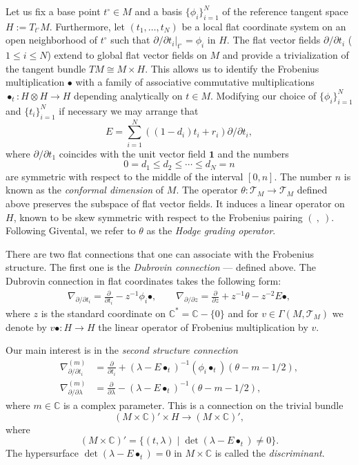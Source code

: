 \documentclass[pdftex]{sigma}
\numberwithin{equation}{section}
\newcommand{\CC}{\mathbb{C}}
\newcommand{\T}{\mathcal{T}}
\begin{document}
Let us fix a base point $t^\circ\in M$ and a basis
$\{\phi_i\}_{i=1}^N$ of the reference tangent space
$H:=T_{t^\circ}M$. Furthermore, let $(t_1,\dots,t_N)$ be a local flat
coordinate system on an open neighborhood of $t^\circ$ such that
$\partial/\partial t_i|_{t^\circ}=\phi_i$ in
$H$. The flat vector fields $\partial/\partial t_i$
($1\leq i\leq N$)
extend to global flat vector fields on $M$ and provide a
trivialization of the tangent bundle $TM\cong M\times H$. This allows us to
identify the Frobenius multiplication $\bullet$ with a family of
associative commutative multiplications~$\bullet_t\colon H\otimes H\to H$
depending analytically on $t\in M$. Modifying our choice of
$\{\phi_i\}_{i=1}^N$ and $\{t_i\}_{i=1}^N$ if necessary we may arrange
that
\[
E=\sum_{i=1}^N ((1-d_i) t_i + r_i)\partial/\partial t_i,
\]
where $\partial/\partial t_1$ coincides with the unit vector field
$\mathbf{1}$ and the numbers
\[
0=d_1\leq d_2\leq \cdots \leq d_N=n
\]
are symmetric with respect to the middle of the interval $[0,n]$. The
number $n$ is known as the {\em conformal dimension} of $M$. The
operator $\theta\colon \T_M\to \T_M$ defined above preserves the subspace of
flat vector fields. It induces a linear
operator on $H$, known to be skew symmetric with respect to
the Frobenius pairing $(\ ,\ )$. Following Givental, we refer to
$\theta$ as the {\em Hodge grading operator}.

There are two flat connections that one can associate with the
Frobenius structure. The first one is the {\em Dubrovin
 connection} --- defined above. The Dubrovin connection in flat
coordinates takes the following form:
\begin{gather*}
\nabla_{\partial/\partial t_i} = \frac{\partial}{\partial t_i} -
z^{-1} \phi_i\bullet, \qquad
\nabla_{\partial/\partial z} = \frac{\partial}{\partial z} +z^{-1}
\theta -z^{-2} E\bullet,
\end{gather*}
where $z$ is the standard coordinate on $\CC^*=\CC-\{0\}$ and
for $v\in \Gamma(M,\T_M)$ we denote by $v\bullet\colon H\to H$ the linear
operator of Frobenius multiplication by $v$.

Our main interest is in the {\em second structure connection }
\begin{align}
 \label{2nd_str_conn:1}
\nabla^{(m)}_{\partial/\partial t_i} & =
\frac{\partial}{\partial t_i} + (\lambda-E\bullet_t)^{-1} (\phi_i
 \bullet_t) (\theta-m-1/2),
 \\
 \label{2nd_str_conn:2}
\nabla^{(m)}_{\partial/\partial\lambda} & =
\frac{\partial}{\partial \lambda}-(\lambda-E\bullet_t)^{-1}
 (\theta-m-1/2),
\end{align}
where $m\in \CC$ is a complex parameter.
This is a connection on the trivial bundle
\[
(M\times \CC)'\times H \to (M\times \CC)',
\]
where
\[
(M\times \CC)'=\{ (t,\lambda)\mid  \det (\lambda-E\bullet_t)\neq 0\}.
\]
The hypersurface $\det (\lambda-E\bullet_t)=0$ in $M\times \CC$ is
called the {\em discriminant}.
\end{document}
